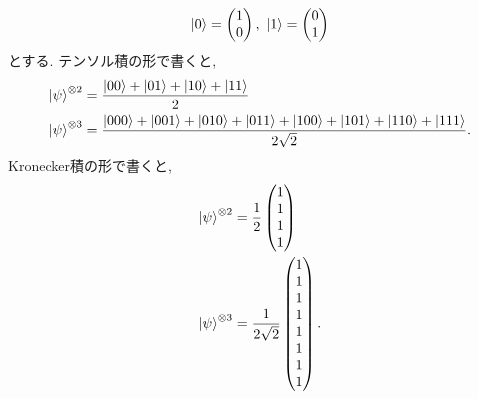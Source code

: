 \begin{ex}
    \label{ex2.26}
    \begin{align*}
        \ket{0} =
        \begin{pmatrix}
            1 \\ 0
        \end{pmatrix}
        , \
        \ket{1} =
        \begin{pmatrix}
            0 \\ 1
        \end{pmatrix}
    \end{align*}
    とする. テンソル積の形で書くと,
    \begin{align*}
        \ket{\psi}^{\otimes 2} & = \frac{\ket{00} + \ket{01} + \ket{10} + \ket{11}}{2} \\
        \ket{\psi}^{\otimes 3} & = \frac{
            \ket{000} + \ket{001} + \ket{010} + \ket{011}
            +\ket{100} + \ket{101} + \ket{110} + \ket{111} }{2\sqrt{2}}.
    \end{align*}
    Kronecker積の形で書くと,
    \begin{align*}
        \ket{\psi}^{\otimes 2}
         & = \frac{1}{2}
        \begin{pmatrix}
            1 \\ 1 \\ 1 \\ 1
        \end{pmatrix} \\
        \ket{\psi}^{\otimes 3}
         & = \frac{1}{2\sqrt{2}}
        \begin{pmatrix}
            1 \\ 1 \\ 1 \\ 1 \\ 1 \\ 1 \\ 1 \\ 1
        \end{pmatrix}.
    \end{align*}
\end{ex}

